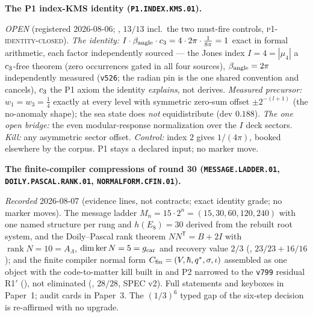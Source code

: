 \par\smallskip\noindent\textbf{The P1 index-KMS identity
(\texttt{P1.INDEX.KMS.01}).}
{\sloppy
\emph{OPEN} (registered 2026-08-06;
, $13/13$ incl.\ the two must-fire
controls, \textsc{p1-identity-closed}).  \emph{The identity:}
$I\cdot\beta_{\rm angle}\cdot c_3=4\cdot2\pi\cdot
\tfrac1{8\pi}=1$ exact in formal arithmetic, each factor
independently sourced --- the Jones index $I=4=|\mu_4|$ a
$c_3$-free theorem (zero occurrences gated in all four
sources), $\beta_{\rm angle}=2\pi$ independently measured
(\texttt{v526}; the radian pin is the one shared convention and
cancels), $c_3$ the P1 axiom the identity \emph{explains},
not derives.  \emph{Measured precursor:} $w_1=w_3=\tfrac14$
exactly at every level with symmetric zero-sum offset
$\pm2^{-(l+1)}$ (the no-anomaly shape); the sea state does
\emph{not} equidistribute (dev $0.188$).  \emph{The one open
bridge:} the even modular-response normalization over the $I$
deck sectors.  \emph{Kill:} any asymmetric sector offset.
\emph{Control:} index $2$ gives $1/(4\pi)$, booked elsewhere by
the corpus.  P1 stays a declared input; no marker move.\par}

\par\smallskip\noindent\textbf{The finite-compiler compressions
of round 30 (\texttt{MESSAGE.LADDER.01},
\texttt{DOILY.PASCAL.RANK.01}, \texttt{NORMALFORM.CFIN.01}).}
{\sloppy
\emph{Recorded} 2026-08-07 (evidence lines, not contracts; exact
identity grade; no marker moves).  The message ladder
$M_n = 15\cdot2^n = (15, 30, 60, 120, 240)$ with one named
structure per rung and $h(E_8) = 30$ derived from the rebuilt
root system, and the Doily--Pascal rank theorem
$NN^{\mathsf T} = B + 2I$ with $\operatorname{rank} N = 10 =
A_\Lambda$, $\dim\ker N = 5 = g_{\mathrm{car}}$ and recovery value $2/3$
(, $23/23 + 16/16$); and the
finite compiler normal form $C_{\rm fin} = (V, \hbar, q^{*},
\sigma, \iota)$ assembled as one object with the code-to-matter
kill built in and P2 narrowed to the \texttt{v799} residual
R1$'$ (\mC), not eliminated
(, $28/28$, SPEC v2).  Full
statements and keyboxes in Paper~1; audit cards in Paper~3.  The
$(1/3)^6$ typed gap of the six-step decision is re-affirmed with
no upgrade.\par}

